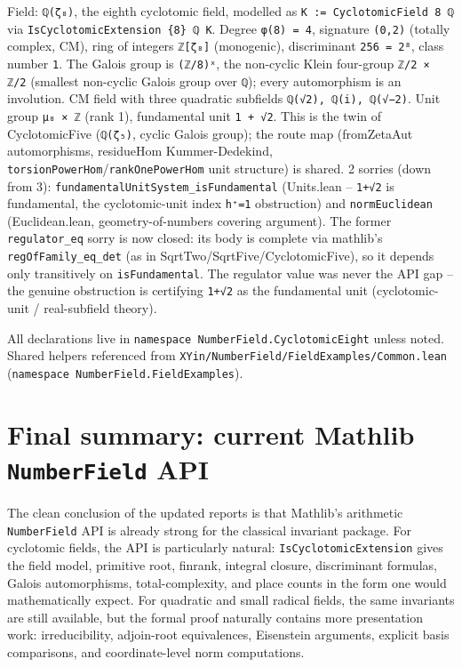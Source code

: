 \documentclass[UTF8,a4paper,11pt,fontset=fandol]{ctexart}
\theoremstyle{definition}
\begin{document}
Field: \texttt{ℚ(ζ₈)}, the eighth cyclotomic field, modelled as \texttt{K := CyclotomicField 8 ℚ} via \texttt{IsCyclotomicExtension \{8\} ℚ K}. Degree \texttt{φ(8) = 4}, signature \texttt{(0,2)} (totally complex, CM), ring of integers \texttt{ℤ[ζ₈]} (monogenic), discriminant \texttt{256 = 2⁸}, class number \texttt{1}. The Galois group is \texttt{(ℤ/\allowbreak{}8)ˣ}, the non-cyclic Klein four-group \texttt{ℤ/\allowbreak{}2 × ℤ/\allowbreak{}2} (smallest non-cyclic Galois group over \texttt{ℚ}); every automorphism is an involution. CM field with three quadratic subfields \texttt{ℚ(√2), ℚ(i), ℚ(√−2)}. Unit group \texttt{μ₈ × ℤ} (rank 1), fundamental unit \texttt{1 + √2}. This is the twin of CyclotomicFive (\texttt{ℚ(ζ₅)}, cyclic Galois group); the route map (fromZetaAut automorphisms, residueHom Kummer-Dedekind, \texttt{torsionPowerHom}/\texttt{rankOnePowerHom} unit structure) is shared. 2 sorries (down from 3): \texttt{fundamentalUnitSystem\_\allowbreak{}isFundamental} (Units.lean -- \texttt{1+√2} is fundamental, the cyclotomic-unit index \texttt{h⁺=1} obstruction) and \texttt{normEuclidean} (Euclidean.lean, geometry-of-numbers covering argument). The former \texttt{regulator\_\allowbreak{}eq} sorry is now closed: its body is complete via mathlib's \texttt{regOfFamily\_\allowbreak{}eq\_\allowbreak{}det} (as in SqrtTwo/SqrtFive/CyclotomicFive), so it depends only transitively on \texttt{isFundamental}. The regulator value was never the API gap -- the genuine obstruction is certifying \texttt{1+√2} as the fundamental unit (cyclotomic-unit / real-subfield theory).

All declarations live in \texttt{namespace NumberField.\allowbreak{}CyclotomicEight} unless noted. Shared helpers referenced from \texttt{XYin/\allowbreak{}NumberField/\allowbreak{}FieldExamples/\allowbreak{}Common.\allowbreak{}lean} (\texttt{namespace NumberField.\allowbreak{}FieldExamples}).

\section{Final summary: current Mathlib \texttt{NumberField} API}

The clean conclusion of the updated reports is that Mathlib's arithmetic \texttt{NumberField}
API is already strong for the classical invariant package.  For cyclotomic fields, the API is
particularly natural: \texttt{IsCyclotomicExtension} gives the field model, primitive root,
finrank, integral closure, discriminant formulas, Galois automorphisms, total-complexity, and
place counts in the form one would mathematically expect.  For quadratic and small radical
fields, the same invariants are still available, but the formal proof naturally contains more
presentation work: irreducibility, adjoin-root equivalences, Eisenstein arguments, explicit
basis comparisons, and coordinate-level norm computations.
\end{document}
